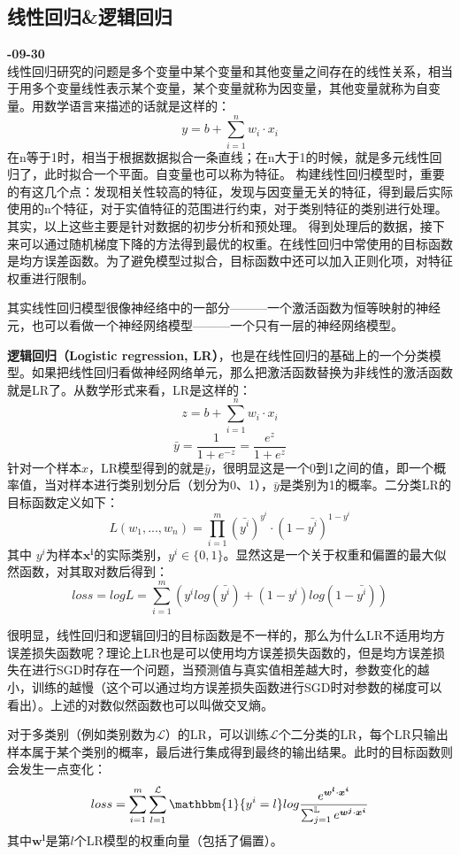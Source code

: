 \subsection{线性回归\&逻辑回归}
\textbf{-09-30}\\
线性回归研究的问题是多个变量中某个变量和其他变量之间存在的线性关系，相当于用多个变量线性表示某个变量，某个变量就称为因变量，其他变量就称为自变量。用数学语言来描述的话就是这样的：
$$
y=b + \sum_{i=1}^{n} w_i \cdot x_i 
$$
在n等于1时，相当于根据数据拟合一条直线；在n大于1的时候，就是多元线性回归了，此时拟合一个平面。自变量也可以称为特征。
构建线性回归模型时，重要的有这几个点：发现相关性较高的特征，发现与因变量无关的特征，得到最后实际使用的n个特征，对于实值特征的范围进行约束，对于类别特征的类别进行处理。其实，以上这些主要是针对数据的初步分析和预处理。
得到处理后的数据，接下来可以通过随机梯度下降的方法得到最优的权重。在线性回归中常使用的目标函数是均方误差函数。为了避免模型过拟合，目标函数中还可以加入正则化项，对特征权重进行限制。

其实线性回归模型很像神经络中的一部分———一个激活函数为恒等映射的神经元，也可以看做一个神经网络模型———一个只有一层的神经网络模型。

\textbf{逻辑回归（Logistic regression, LR）}，也是在线性回归的基础上的一个分类模型。如果把线性回归看做神经网络单元，那么把激活函数替换为非线性的激活函数就是LR了。从数学形式来看，LR是这样的：
$$
z = b + \sum_{i=1}^{n} w_i \cdot x_i 
$$
$$
\bar{y} = \frac{1}{1 + e^{-z}} = \frac{e^z}{1 + e^z}
$$
针对一个样本$x$，LR模型得到的就是$\bar{y}$，很明显这是一个0到1之间的值，即一个概率值，当对样本进行类别划分后（划分为0、1），$\bar{y}$是类别为1的概率。二分类LR的目标函数定义如下：
$$
L(w_1,...,w_n) = \prod_{i = 1}^{m} (\bar{y^i} )^{y^i} \cdot ( 1 - \bar{y^i}) ^ {1 - y^i}
$$
其中 $y^i$为样本$\boldsymbol{x^i}$的实际类别，$y^i \in \{0, 1\}$。显然这是一个关于权重和偏置的最大似然函数，对其取对数后得到：
$$
loss = log L = \sum_{i=1}^{m} \left( y^i log (\bar{y^i}) + (1 - y^i) log ( 1 - \bar{y^i}) \right)
$$

很明显，线性回归和逻辑回归的目标函数是不一样的，那么为什么LR不适用均方误差损失函数呢？理论上LR也是可以使用均方误差损失函数的，但是均方误差损失在进行SGD时存在一个问题，当预测值与真实值相差越大时，参数变化的越小，训练的越慢（{\color{red}这个可以通过均方误差损失函数进行SGD时对参数的梯度可以看出}）。上述的对数似然函数也可以叫做交叉熵。

对于多类别（例如类别数为$\mathcal{L}$）的LR，可以训练$\mathcal{L}$个二分类的LR，每个LR只输出样本属于某个类别的概率，最后进行集成得到最终的输出结果。此时的目标函数则会发生一点变化：
$$
loss = \sum_{i=1}^{m} \sum_{l=1}^{\mathcal{L}} \mathbbm{1}\{y^i = l\} log \frac{e^{ \boldsymbol{w^l} \cdot \boldsymbol{x^i} } }{ \sum_{j=1}^{\mathbb{L}} e^{ \boldsymbol{w^j} \cdot \boldsymbol{x^i}} }
$$
其中$\boldsymbol{w^l}$是第$l$个LR模型的权重向量（包括了偏置）。

